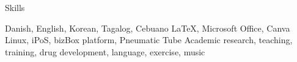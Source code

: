 \begin{rubric}{\faStar[solid] Skills}

\entry*[Languages][\faLanguage]
	Danish, English, Korean, Tagalog, Cebuano
\entry*[Productivity][\faCode]
	\LaTeX, Microsoft Office, Canva
\entry*[Technologies][\faTerminal]
	Linux, iPoS, bizBox platform, Pneumatic Tube
\entry*[Misc.][\faUser]
	Academic research, teaching, training, drug development, language, exercise, music
\end{rubric}
